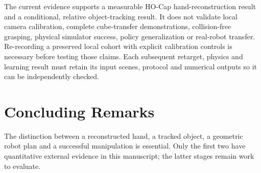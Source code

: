 The current evidence supports a measurable HO-Cap hand-reconstruction
result and a conditional, relative object-tracking result. It does
not validate local camera calibration, complete cube-transfer
demonstrations, collision-free grasping, physical simulator success,
policy generalization or real-robot transfer. Re-recording a
preserved local cohort with explicit calibration controls is necessary
before testing those claims. Each subsequent retarget, physics and
learning result must retain its input scenes, protocol and numerical
outputs so it can be independently checked.

\section{Concluding Remarks}
\label{sec:remarks}

The distinction between a reconstructed hand, a tracked object, a
geometric robot plan and a successful manipulation is essential.
Only the first two have quantitative external evidence in this
manuscript; the latter stages remain work to evaluate.
